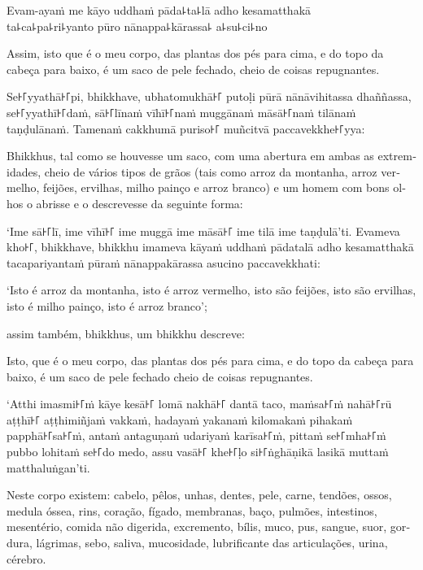Evam-ayaṁ me kāyo uddhaṁ pāda꜕ta꜕lā adho kesamatthakā\\
ta꜕ca꜕pa꜕ri꜕yanto pūro nānappa꜕kārassa꜕ a꜕su꜕ci꜕no

\begin{english}
  Assim, isto que é o meu corpo, das plantas dos pés para cima, e do topo da cabeça para baixo, é um saco de pele fechado, cheio de coisas repugnantes.
\end{english}

\clearpage

Se꜔꜒yyathā꜔꜒pi, bhikkhave, ubhatomukhā꜔꜒ putoḷi pūrā nānāvihitassa dhaññassa,
se꜔꜒yyathī꜔꜒daṁ, sā꜔꜒līnaṁ vīhī꜔꜒naṁ muggānaṁ māsā꜔꜒naṁ tilānaṁ taṇḍulānaṁ. Tamenaṁ
cakkhumā puriso꜔꜒ muñcitvā paccavekkhe꜔꜒yya:

\begin{english}
  Bhikkhus, tal como se houvesse um saco, com uma abertura em ambas as
  extremidades, cheio de vários tipos de grãos (tais como arroz da montanha,
  arroz vermelho, feijões, ervilhas, milho painço e arroz branco) e um homem com
  bons olhos o abrisse e o descrevesse da seguinte forma:
\end{english}

‘Ime sā꜔꜒lī, ime vīhī꜔꜒ ime muggā ime māsā꜔꜒ ime tilā ime taṇḍulā’ti. Evameva kho꜔꜒,
bhikkhave, bhikkhu imameva kāyaṁ uddhaṁ pādatalā adho kesamatthakā
tacapariyantaṁ pūraṁ nānappakārassa asucino paccavekkhati:

\begin{english}
  ‘Isto é arroz da montanha, isto é arroz vermelho, isto são feijões, isto são
  ervilhas, isto é milho painço, isto é arroz branco’;

  assim também, bhikkhus, um bhikkhu descreve:

  Isto, que é o meu corpo, das plantas dos pés para cima, e do topo da cabeça
  para baixo, é um saco de pele fechado cheio de coisas repugnantes.
\end{english}

‘Atthi imasmi꜔꜒ṁ kāye kesā꜔꜒ lomā nakhā꜔꜒ dantā taco, maṁsa꜔꜒ṁ nahā꜔꜒rū aṭṭhī꜔꜒ aṭṭhimiñjaṁ
vakkaṁ, hadayaṁ yakanaṁ kilomakaṁ pihakaṁ papphā꜔꜒sa꜔꜒ṁ, antaṁ antaguṇaṁ udariyaṁ
karīsa꜔꜒ṁ, pittaṁ se꜔꜒mha꜔꜒ṁ pubbo lohitaṁ se꜔꜒do medo, assu vasā꜔꜒ khe꜔꜒ḷo si꜔꜒ṅghāṇikā
lasikā muttaṁ matthaluṅgan’ti.

\begin{english}
  Neste corpo existem:
  cabelo, pêlos, unhas, dentes, pele,
  carne, tendões, ossos, medula óssea, rins,
  coração, fígado, membranas, baço, pulmões,
  intestinos, mesentério, comida não digerida, excremento,
  bílis, muco, pus, sangue, suor, gordura,
  lágrimas, sebo, saliva, mucosidade, lubrificante das articulações, urina, cérebro.
\end{english}

